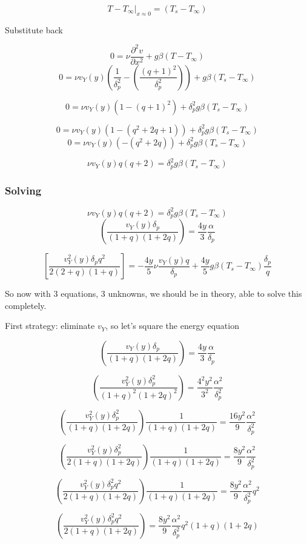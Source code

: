 \documentclass[11pt]{article}
\begin{document}
$$T-T_\infty|_{x\approx 0} = (T_s -T_\infty)$$


Substitute back

$$ 0 =  \nu \frac{\partial ^2 v}{\partial x^2} + g\beta (T-T_\infty)$$
$$ 0 =  \nu v_Y (y)  (\frac{1}{\delta_p^2} - (\frac{(q + 1)^2}{ \delta_p^2}) ) + g\beta (T_s -T_\infty)$$

$$ 0 =  \nu v_Y (y)  (1 - (q + 1)^2 ) +  \delta_p^2 g\beta (T_s -T_\infty)$$


$$ 0 =  \nu v_Y (y)  (1 - (q^2+2q+1)  ) +  \delta_p^2 g\beta (T_s -T_\infty)$$
$$ 0 =  \nu v_Y (y)  (- (q^2+2q)  ) +  \delta_p^2 g\beta (T_s -T_\infty)$$


$$   \nu v_Y (y)  q (q+2) =  \delta_p^2 g\beta (T_s -T_\infty)$$


\subsubsection{Solving}

$$   \nu v_Y (y)  q (q+2) =  \delta_p^2 g\beta (T_s -T_\infty)$$
$$   ( \frac{ v_Y (y) \delta_p}{(1 + q)(1+2q)}  ) = \frac{4y}{3} \frac{\alpha}{\delta_p}$$


$$\left[  \frac{v_Y^2 (y) \delta_p q^2  }{2(2+q)(1+ q)} \right] = -\frac{4y}{5} \nu  \frac{ v_Y (y) q}{\delta_p} + \frac{4y}{5}  g\beta  (T_s -T_\infty) \frac{\delta_p}{q}$$

So now with 3 equations, 3 unknowns, we should be in theory, able to solve this completely.

First strategy: eliminate $v_Y$, so let's square the energy equation


$$   ( \frac{ v_Y (y) \delta_p}{(1 + q)(1+2q)}  ) = \frac{4y}{3} \frac{\alpha}{\delta_p}$$

$$   ( \frac{ v_Y^2 (y) \delta_p^2}{(1 + q)^2(1+2q)^2}  ) = \frac{4^2y^2}{3^2} \frac{\alpha^2}{\delta_p^2}$$

$$   ( \frac{ v_Y^2 (y) \delta_p^2}{(1 + q)(1+2q)}  ) \frac{1}{(1 + q)(1+2q)} = \frac{16 y^2}{9} \frac{\alpha^2}{\delta_p^2}$$

$$   ( \frac{ v_Y^2 (y) \delta_p^2}{2(1 + q)(1+2q)}  ) \frac{1}{(1 + q)(1+2q)} = \frac{8 y^2}{9} \frac{\alpha^2}{\delta_p^2}$$

$$   ( \frac{ v_Y^2 (y) \delta_p^2 q^2}{2(1 + q)(1+2q)}  ) \frac{1}{(1 + q)(1+2q)} = \frac{8 y^2}{9} \frac{\alpha^2}{\delta_p^2}q^2$$

$$   ( \frac{ v_Y^2 (y) \delta_p^2 q^2}{2(1 + q)(1+2q)}  )  = \frac{8 y^2}{9} \frac{\alpha^2}{\delta_p^2}q^2 (1 + q)(1+2q)$$
\end{document}

